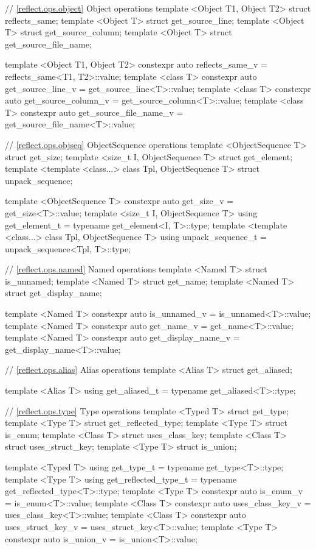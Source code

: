 \begin{std.txt}
\begin{codeblock}
{{// \ref{reflect.ops.object} Object operations
template <Object T1, Object T2> struct reflects_same;
template <Object T> struct get_source_line;
template <Object T> struct get_source_column;
template <Object T> struct get_source_file_name;

template <Object T1, Object T2>
  constexpr auto reflects_same_v = reflects_same<T1, T2>::value;
template <class T>
  constexpr auto get_source_line_v = get_source_line<T>::value;
template <class T>
  constexpr auto get_source_column_v = get_source_column<T>::value;
template <class T>
  constexpr auto get_source_file_name_v = get_source_file_name<T>::value;

// \ref{reflect.ops.objseq} ObjectSequence operations
template <ObjectSequence T> struct get_size;
template <size_t I, ObjectSequence T> struct get_element;
template <template <class...> class Tpl, ObjectSequence T>
  struct unpack_sequence;

template <ObjectSequence T>
  constexpr auto get_size_v = get_size<T>::value;
template <size_t I, ObjectSequence T>
  using get_element_t = typename get_element<I, T>::type;
template <template <class...> class Tpl, ObjectSequence T>
  using unpack_sequence_t = unpack_sequence<Tpl, T>::type;

// \ref{reflect.ops.named} Named operations
template <Named T> struct is_unnamed;
template <Named T> struct get_name;
template <Named T> struct get_display_name;

template <Named T>
  constexpr auto is_unnamed_v = is_unnamed<T>::value;
template <Named T>
  constexpr auto get_name_v = get_name<T>::value;
template <Named T>
  constexpr auto get_display_name_v = get_display_name<T>::value;

// \ref{reflect.ops.alias} Alias operations
template <Alias T> struct get_aliased;

template <Alias T>
  using get_aliased_t = typename get_aliased<T>::type;

// \ref{reflect.ops.type} Type operations
template <Typed T> struct get_type;
template <Type T> struct get_reflected_type;
template <Type T> struct is_enum;
template <Class T> struct uses_class_key;
template <Class T> struct uses_struct_key;
template <Type T> struct is_union;

template <Typed T>
  using get_type_t = typename get_type<T>::type;
template <Type T>
  using get_reflected_type_t = typename get_reflected_type<T>::type;
template <Type T>
  constexpr auto is_enum_v = is_enum<T>::value;
template <Class T>
  constexpr auto uses_class_key_v = uses_class_key<T>::value;
template <Class T>
  constexpr auto uses_struct_key_v = uses_struct_key<T>::value;
template <Type T>
  constexpr auto is_union_v = is_union<T>::value;

}}
\end{codeblock}
\end{std.txt}
